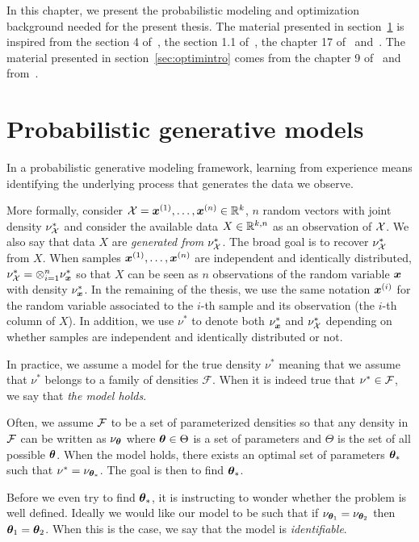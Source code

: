 In this chapter, we present the probabilistic modeling and
optimization background needed for the present thesis. The material presented in
section~\ref{sec:probgenmodel} is inspired
from the section 4 of~\cite{levy2012probabilistic}, the section 1.1
of~\cite{ablin2019exploration}, the chapter 17 of~\cite{ferguson2017course}
and~\cite{stein1956inadmissibility}. The material presented in
section~\ref{sec:optimintro} comes from the chapter 9 of~\cite{boyd2004convex}
and from~\cite{neal1998view}.

\section{Probabilistic generative models}
\label{sec:probgenmodel}
In a probabilistic generative modeling framework, learning from experience means identifying the underlying process that generates the data we observe.

More formally, consider $\mathcal{X} = \boldsymbol{x}^{(1)}, \dots, \boldsymbol{x}^{(n)} \in \mathbb{R}^k$, $n$ random
vectors with joint density $\nu^*_{\mathcal{X}}$ and consider the available data $X \in \mathbb{R}^{k,
  n}$ as an observation of $\mathcal{X}$. We also say that data $X$ are \emph{generated from} $\nu^*_{\mathcal{X}}$.
The broad
goal is to recover $\nu^*_{\mathcal{X}}$ from $X$. When samples $\boldsymbol{x}^{(1)},
\dots, \boldsymbol{x}^{(n)}$ are independent and identically distributed,
$\nu^*_{\mathcal{X}} = \otimes_{i=1}^n \nu^*_{\boldsymbol{x}}$ so that
$X$ can be seen as $n$ observations of the random variable $\boldsymbol{x}$ with density
$\nu^*_{\boldsymbol{x}}$. In the remaining of the thesis, we use the same notation $\boldsymbol{x}^{(i)}$ for the random variable associated to the $i$-th sample and its observation (the $i$-th column
of $X$). In addition, we use $\nu^*$ to denote both $\nu^*_{\boldsymbol{x}}$ and $\nu^*_{\mathcal{X}}$ 
depending on whether samples are independent and identically
distributed or not.

In practice, we assume a model for the true density $\nu^*$ meaning that we
assume that $\nu^*$ belongs to a family of densities $\mathcal{F}$.
When it is indeed true that $\nu^* \in \mathcal{F}$, we say that \emph{the model holds}.

Often, we assume $\mathcal{F}$ to be a set of parameterized densities so
that any density in $\mathcal{F}$ can be written as $\nu_{\boldsymbol{\theta}}$ where
$\boldsymbol{\theta} \in \Theta$ is a set of parameters and $\Theta$ is the set of all
possible $\boldsymbol{\theta}$. When the model holds, there exists an optimal
set of parameters $\boldsymbol{\theta}_*$ such that $\nu^* = \nu_{\boldsymbol{\theta}_*}$. The goal is then
to find $\boldsymbol{\theta}_*$.


Before we even try to find $\boldsymbol{\theta}_*$, it is instructing to wonder whether the
problem is well defined. Ideally we would like our model to be such that if
$\nu_{\boldsymbol{\theta}_1} = \nu_{\boldsymbol{\theta}_2}$ then $\boldsymbol{\theta}_1=\boldsymbol{\theta}_2$.
When this is the case, we say that the model is \emph{identifiable}.

